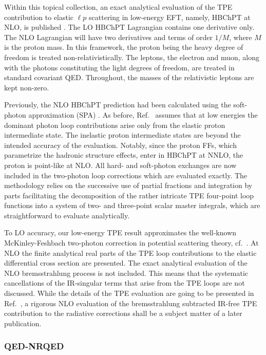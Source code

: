 Within this topical collection, an  exact analytical evaluation of the TPE contribution to elastic $\ell p$ scattering in low-energy EFT, namely, HBChPT  at NLO, is published \cite{choudhary2023analytical}.
The LO HBChPT
Lagrangian contains one derivative only. The NLO Lagrangian  will have two derivatives and terms of order $1/M$, where $M$ is the proton mass. 
In this framework, the proton being the heavy degree of freedom is treated non-relativistically. The leptons, the electron and muon, along with the photons constituting the light degrees of freedom, are treated in standard covariant QED. Throughout, the masses of the relativistic leptons are kept non-zero. 

Previously, the NLO HBChPT prediction had been calculated using the soft-photon approximation (SPA) \cite{Talukdar:2019dko,Talukdar:2020aui}. As before, Ref.~\cite{choudhary2023analytical} assumes 
that at low energies the dominant photon loop contributions arise only from the elastic proton intermediate state.  The inelastic proton intermediate states are beyond the intended accuracy of the evaluation. Notably, since the proton FFs, which parametrize the hadronic structure effects, enter in HBChPT at NNLO, the proton is point-like at NLO. All hard- and soft-photon exchanges are now included in the two-photon loop corrections which are evaluated exactly. The methodology relies on the successive use of partial fractions and integration by parts facilitating the decomposition of the rather intricate TPE four-point loop functions into a system of two- and three-point scalar master integrals, which are straightforward to evaluate analytically. 
 
To LO accuracy, our low-energy TPE result approximates the well-known McKinley-Feshbach two-photon correction in potential scattering theory, cf.\ . At NLO the finite analytical real parts of the TPE loop contributions to the elastic differential cross section are presented. The exact analytical evaluation of the NLO bremsstrahlung process is not included. This means that the systematic cancellations of the IR-singular terms that arise from the TPE loops are not discussed. While the details of the TPE evaluation are going to be presented in Ref.~\cite{choudhary2023analytical}, 
a rigorous NLO evaluation of the bremsstrahlung subtracted IR-free TPE contribution to the radiative corrections shall be a subject matter of a later publication.

\subsubsection{QED-NRQED}

